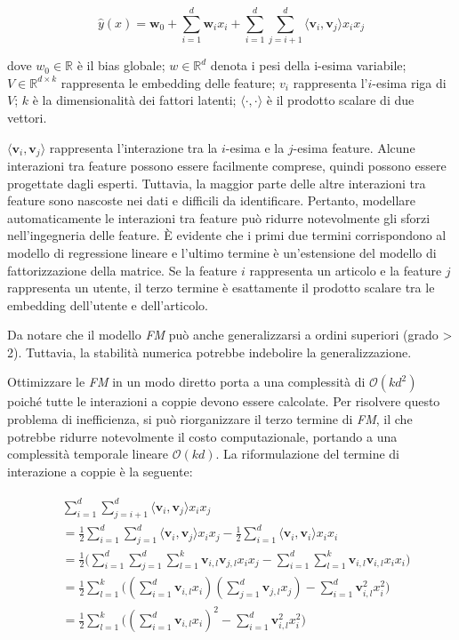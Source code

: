 \[
\hat{y}(x) = \mathbf{w}_0 + \sum_{i=1}^d \mathbf{w}_i x_i + \sum_{i=1}^d\sum_{j=i+1}^d \langle\mathbf{v}_i, \mathbf{v}_j\rangle x_i x_j
\]

dove $w_0 \in \mathbb{R}$ è il bias globale; $w \in \mathbb{R}^d$ denota i pesi della i-esima variabile; $V \in \mathbb{R}^{d\times k}$ rappresenta le embedding delle feature; $v_i$ rappresenta l'$i$-esima riga di $V$; $k$ è la dimensionalità dei fattori latenti; $\langle\cdot, \cdot \rangle$ è il prodotto scalare di due vettori.

$\langle \mathbf{v}_i, \mathbf{v}_j \rangle$ rappresenta l'interazione tra la $i$-esima e la $j$-esima feature. Alcune interazioni tra feature possono essere facilmente comprese, quindi possono essere progettate dagli esperti. Tuttavia, la maggior parte delle altre interazioni tra feature sono nascoste nei dati e difficili da identificare. Pertanto, modellare automaticamente le interazioni tra feature può ridurre notevolmente gli sforzi nell'ingegneria delle feature. È evidente che i primi due termini corrispondono al modello di regressione lineare e l'ultimo termine è un'estensione del modello di fattorizzazione della matrice. Se la feature $i$ rappresenta un articolo e la feature $j$ rappresenta un utente, il terzo termine è esattamente il prodotto scalare tra le embedding dell'utente e dell'articolo.

Da notare che il modello \textit{FM} può anche generalizzarsi a ordini superiori (grado > 2). Tuttavia, la stabilità numerica potrebbe indebolire la generalizzazione.

Ottimizzare le \textit{FM} in un modo diretto porta a una complessità di $\mathcal{O}(kd^2)$ poiché tutte le interazioni a coppie devono essere calcolate. Per risolvere questo problema di inefficienza, si può riorganizzare il terzo termine di \textit{FM}, il che potrebbe ridurre notevolmente il costo computazionale, portando a una complessità temporale lineare $\mathcal{O}(kd)$. La riformulazione del termine di interazione a coppie è la seguente:

\[
\begin{split}\begin{aligned}
&\sum_{i=1}^d \sum_{j=i+1}^d \langle\mathbf{v}_i, \mathbf{v}_j\rangle x_i x_j \\
 &= \frac{1}{2} \sum_{i=1}^d \sum_{j=1}^d\langle\mathbf{v}_i, \mathbf{v}_j\rangle x_i x_j - \frac{1}{2}\sum_{i=1}^d \langle\mathbf{v}_i, \mathbf{v}_i\rangle x_i x_i \\
 &= \frac{1}{2} \big (\sum_{i=1}^d \sum_{j=1}^d \sum_{l=1}^k\mathbf{v}_{i, l} \mathbf{v}_{j, l} x_i x_j - \sum_{i=1}^d \sum_{l=1}^k \mathbf{v}_{i, l} \mathbf{v}_{i, l} x_i x_i \big)\\
 &=  \frac{1}{2} \sum_{l=1}^k \big ((\sum_{i=1}^d \mathbf{v}_{i, l} x_i) (\sum_{j=1}^d \mathbf{v}_{j, l}x_j) - \sum_{i=1}^d \mathbf{v}_{i, l}^2 x_i^2 \big ) \\
 &= \frac{1}{2} \sum_{l=1}^k \big ((\sum_{i=1}^d \mathbf{v}_{i, l} x_i)^2 - \sum_{i=1}^d \mathbf{v}_{i, l}^2 x_i^2)
 \end{aligned}\end{split}
\]

